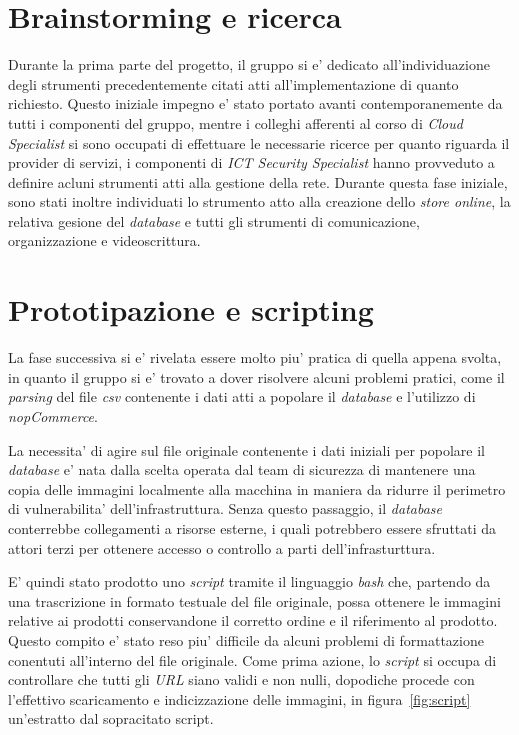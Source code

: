 \documentclass[a4paper]{report}
\begin{document}
	\section{Brainstorming e ricerca}\label{brainstorming_e_ricerca}
		Durante la prima parte del progetto, il gruppo si e' dedicato all'individuazione degli strumenti precedentemente
		citati atti all'implementazione di quanto richiesto. Questo iniziale impegno e' stato portato avanti
		contemporanemente da tutti i componenti del gruppo, mentre i colleghi afferenti al corso di \emph{Cloud
		Specialist} si sono occupati di effettuare le necessarie ricerce per quanto riguarda il provider di servizi, i
		componenti di \emph{ICT Security Specialist} hanno provveduto a definire acluni strumenti atti alla
		gestione della rete.
		Durante questa fase iniziale, sono stati inoltre individuati lo strumento atto alla creazione dello \emph{store
		online}, la relativa gesione del \emph{database} e tutti gli strumenti di comunicazione, organizzazione e
		videoscrittura.
	\section{Prototipazione e scripting}\label{prototipazione_e_scripting}
		La fase successiva si e' rivelata essere molto piu' pratica di quella appena svolta, in quanto il gruppo si e'
		trovato a dover risolvere alcuni problemi pratici, come il \emph{parsing} del file \emph{csv}
		contenente i dati atti a popolare il \emph{database} e l'utilizzo di \emph{nopCommerce}.

		La necessita' di agire sul file originale contenente i dati iniziali per popolare il \emph{database} e' nata
		dalla scelta operata dal team di sicurezza di mantenere una copia delle immagini localmente alla macchina in
		maniera da ridurre il perimetro di vulnerabilita' dell'infrastruttura. Senza questo passaggio, il
		\emph{database} conterrebbe collegamenti a risorse esterne, i quali potrebbero essere sfruttati da attori
		terzi per ottenere accesso o controllo a parti dell'infrasturttura.

		E' quindi stato prodotto uno \emph{script} tramite  il linguaggio \emph{bash} che, partendo da una trascrizione
		in formato testuale del file originale, possa ottenere le immagini relative ai prodotti conservandone il
		corretto ordine e il riferimento al prodotto. Questo compito e' stato reso piu' difficile da alcuni problemi di
		formattazione conentuti all'interno del file originale. Come prima azione, lo \emph{script} si occupa di
		controllare che tutti gli \emph{URL} siano validi e non nulli, dopodiche procede con l'effettivo scaricamento e
		indicizzazione delle immagini, in figura~\ref{fig:script} un'estratto dal sopracitato script.
\end{document}
